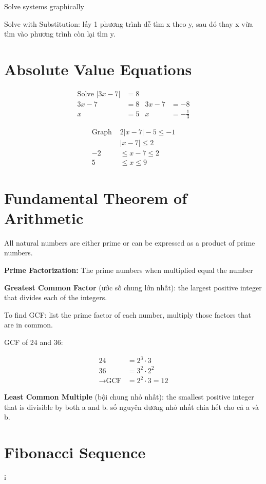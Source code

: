 Solve systems graphically

Solve with Substitution: lấy 1 phương trình dễ tìm x theo y, sau đó thay x vừa tìm vào phương trình còn lại tìm y.

\section{Absolute Value Equations}

\begin{align*}
  \text{Solve } |3x-7| &= 8\\
  3x-7&=8      &  3x-7&=-8\\
  x&=5         &  x&=-\frac{1}{3}
\end{align*}

\vspace{5mm}

\begin{align*}
  \text{Graph } &2|x-7 | -5 \leq -1\\
  &|x-7 | \leq 2\\
  -2 &\leq x-7 \leq 2\\
  5 &\leq x \leq 9
\end{align*}

\section{Fundamental Theorem of Arithmetic}

All natural numbers are either prime or can be expressed as a product of prime numbers.

\textbf{Prime Factorization:} The prime numbers when multiplied equal the number

\vspace{10 mm}

\textbf{Greatest Common Factor} (ước số chung lớn nhất): the largest positive integer that divides each of the integers.

To find GCF: list the prime factor of each number, multiply those factors that are in common.

GCF of 24 and 36:

\[
  \begin{aligned}
    24 &= 2^{3} \cdot 3\\
    36 &= 3^{2} \cdot 2^{2}\\
    \rightarrow \text{GCF} &= 2^{2} \cdot 3 = 12
  \end{aligned}\]
\[\]

\textbf{Least Common Multiple} (bội chung nhỏ nhất): the smallest positive integer that is divisible by both a and b. số nguyên dương nhỏ nhất chia hết cho cả a và b.

\section{Fibonacci Sequence}

i

